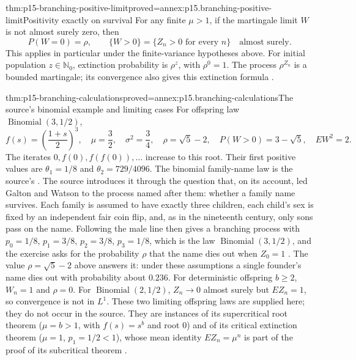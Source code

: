 \begin{hbtheorem}{thm:p15-branching-positive-limit}{proved=annex:p15.branching-positive-limit}{Positivity exactly on survival}
For any finite \(\mu>1\), if the martingale limit \(W\) is not
almost surely zero, then
\[
                 P(W=0)=\rho,\qquad
                 \{W>0\}=\{Z_n>0\text{ for every }n\}
                                      \quad\text{almost surely}.
\]
This applies in particular under the finite-variance hypotheses above.
For initial population \(z\in\mathbb N_0\), extinction probability is
\(\rho^z\), with \(\rho^0=1\). The process \(\rho^{Z_n}\) is a
bounded martingale; its convergence also gives this extinction formula
\cite[exs.~4.3.11--12]{DurrettPTEAuthor2019}.
\end{hbtheorem}

\begin{hbtheorem}{thm:p15-branching-calculations}{proved=annex:p15.branching-calculations}{The source's binomial example and limiting cases}
For offspring law \(\operatorname{Binomial}(3,1/2)\),
\[
   f(s)=\left(\frac{1+s}{2}\right)^3,\quad
   \mu=\frac32,\quad \sigma^2=\frac34,\quad
   \rho=\sqrt5-2,\quad P(W>0)=3-\sqrt5,\quad EW^2=2.
\]
The iterates \(0,f(0),f(f(0)),\ldots\) increase to this root.
Their first positive values are \(\theta_1=1/8\) and
\(\theta_2=729/4096\).
The binomial family-name law is the source's
\cite[ex.~4.3.13 and figs.~4.3--4.4]{DurrettPTEAuthor2019}.
The source introduces it through the question that, on its account,
led Galton and Watson to the process named after them: whether a family
name survives. Each family is assumed to have exactly three children,
each child's sex is fixed by an independent fair coin flip, and, as in
the nineteenth century, only sons pass on the name. Following the male
line then gives a branching process with
\(p_0=1/8\), \(p_1=3/8\), \(p_2=3/8\), \(p_3=1/8\), which is the law
\(\operatorname{Binomial}(3,1/2)\), and the exercise asks for the
probability \(\rho\) that the name dies out when \(Z_0=1\)
\cite[ex.~4.3.13, p.~234]{DurrettPTEAuthor2019}. The value
\(\rho=\sqrt5-2\) above answers it: under these assumptions a single
founder's name dies out with probability about \(0.236\).
For deterministic offspring \(b\geq2\), \(W_n=1\) and \(\rho=0\).
For \(\operatorname{Binomial}(2,1/2)\), \(Z_n\to0\) almost surely
but \(EZ_n=1\), so convergence is not in \(L^1\).
These two limiting offspring laws are supplied here; they do not occur
in the source. They are instances of its supercritical root theorem
(\(\mu=b>1\), with \(f(s)=s^b\) and root \(0\)) and of its critical
extinction theorem (\(\mu=1\), \(p_1=1/2<1\)), whose mean identity
\(EZ_n=\mu^n\) is part of the proof of its subcritical theorem
\cite[thms.~4.3.10--4.3.12, pp.~231--232]{DurrettPTEAuthor2019}.
\end{hbtheorem}


